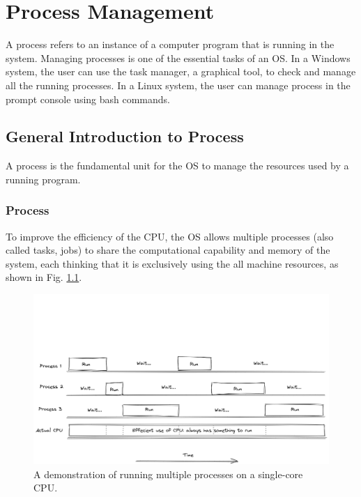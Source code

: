 \chapter{Process Management} \label{ch:pm}

A process refers to an instance of a computer program that is running in the system. Managing processes is one of the essential tasks of an OS. In a Windows system, the user can use the task manager, a graphical tool, to check and manage all the running processes. In a Linux system, the user can manage process in the prompt console using bash commands.

\section{General Introduction to Process}

A process is the fundamental unit for the OS to manage the resources used by a running program.

\subsection{Process}

To improve the efficiency of the CPU, the OS allows multiple processes (also called tasks, jobs) to share the computational capability and memory of the system, each thinking that it is exclusively using the all machine resources, as shown in Fig. \ref{ch:pm:fig:processflow}.

\begin{figure}[htbp]
	\centering
	\includegraphics[width=350pt]{chapters/part-1/figures/processflow.png}
	\caption{A demonstration of running multiple processes on a single-core CPU.} \label{ch:pm:fig:processflow}
\end{figure}

